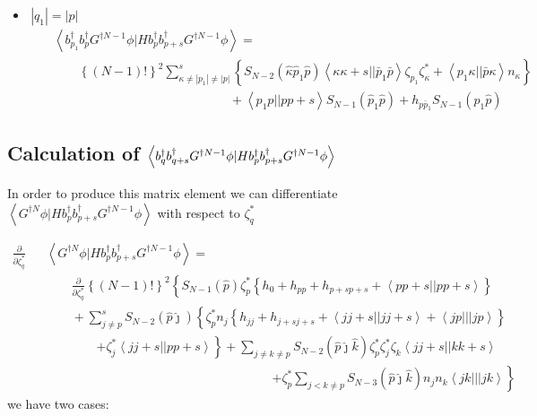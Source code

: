 \begin{itemize}
\item $\,\left| q_{1}\right| =\left| p\right| \,$%
\begin{eqnarray}
&&\left\langle b_{p_{1}}^{\dagger }b_{p}^{\dagger }G^{\dagger N-1}\phi
|Hb_{p}^{\dagger }b_{p+s}^{\dagger }G^{\dagger N-1}\phi \right\rangle = 
\nonumber \\
&&\qquad \left\{ \left( N-1\right) !\right\} ^{2}\sum_{\kappa \neq \left|
p_{1}\right| \neq \left| p\right| }^{s}\left\{ S_{N-2}\left( \hat{\kappa}%
\hat{p}_{1}\hat{p}\right) \left\langle \kappa \kappa +s||\bar{p}_{1}\bar{p}%
\right\rangle \zeta _{p_{1}}\zeta _{\kappa }^{\ast }+\left\langle
p_{1}\kappa ||\bar{p}\kappa \right\rangle n_{\kappa }\right\}  \nonumber \\
&&\qquad \qquad \qquad \qquad \qquad \qquad \qquad +\left\langle
p_{1}p||pp+s\right\rangle S_{N-1}\left( \hat{p}_{1}\hat{p}\right) +h_{p\bar{p%
}_{1}}S_{N-1}\left( \hat{p}_{1}\hat{p}\right)
\end{eqnarray}
\end{itemize}

\subsection{Calculation of $\left\langle b_{q}^{\dagger }b_{q+s}^{\dagger
}G^{\dagger N-1}\protect\phi |Hb_{p}^{\dagger }b_{p+s}^{\dagger }G^{\dagger
N-1}\protect\phi \right\rangle $}

In order to produce this matrix element we can differentiate $\left\langle
G^{\dagger N}\phi |Hb_{p}^{\dagger }b_{p+s}^{\dagger }G^{\dagger N-1}\phi
\right\rangle $ with respect to $\zeta _{q}^{\ast }$

\begin{eqnarray}
\frac{\partial }{\partial \zeta _{q}^{\ast }} &&\left\langle G^{\dagger
N}\phi |Hb_{p}^{\dagger }b_{p+s}^{\dagger }G^{\dagger N-1}\phi \right\rangle
=  \nonumber \\
&&\qquad \frac{\partial }{\partial \zeta _{q}^{\ast }}\left\{ \left(
N-1\right) !\right\} ^{2}\left\{ S_{N-1}\left( \hat{p}\right) \zeta
_{p}^{\ast }\left\{ h_{0}+h_{pp}+h_{p+sp+s}+\left\langle
pp+s||pp+s\right\rangle \right\} \right.  \nonumber \\
&&\left. {}\right. \qquad +\sum_{j\neq p}^{s}S_{N-2}\left( \hat{p}\hat{\jmath%
}\right) \left\{ \zeta _{p}^{\ast }n_{j}\left\{
h_{jj}+h_{j+sj+s}+\left\langle jj+s||jj+s\right\rangle +\left\langle
jp|||jp\right\rangle \right\} \right.  \nonumber \\
&&\left. {}\right. \qquad \qquad \left. +\zeta _{j}^{\ast }\left\langle
jj+s||pp+s\right\rangle \right\} +\sum_{j\neq k\neq p}S_{N-2}\left( \hat{p}%
\hat{\jmath}\hat{k}\right) \zeta _{p}^{\ast }\zeta _{j}^{\ast }\zeta
_{k}\left\langle jj+s||kk+s\right\rangle  \nonumber \\
&&\qquad \qquad \qquad \qquad \qquad \qquad \qquad \qquad \qquad \left.
+\zeta _{p}^{\ast }\sum_{j<k\neq p}S_{N-3}\left( \hat{p}\hat{\jmath}\hat{k}%
\right) n_{j}n_{k}\left\langle jk|||jk\right\rangle \right\}
\end{eqnarray}%
we have two cases:

